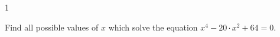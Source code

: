 
\AddToShipoutPicture*{\BackgroundPic}

\addtocounter {ProbNum} {1}

 
{\bf \Large{}} Find all possible values of $x$ which solve the equation ${x^{4}-20\cdot x^{2}+64=0}$.



\vfill

\newpage

